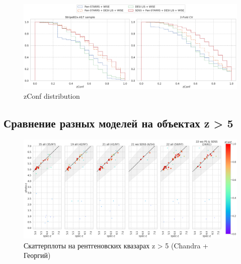 \documentclass[fleqn,usenatbib]{mnras}
\begin{document}
\begin{figure}
    \centering
    \includegraphics[width=0.9\linewidth]{images/zconf-cal.png}
    \caption{zConf distribution}
    \label{fig:zconf-cal-dr16q}
\end{figure}

\subsection{Сравнение разных моделей на объектах z > 5}

\begin{figure}
    \centering
    \includegraphics[width=0.9\linewidth]{images/xray-qso-zgr5.png}
    \caption{Скаттерплоты на рентгеновских квазарах z > 5 (Chandra + Георгий)}
    \label{fig:my_label}
\end{figure}
\end{document}
